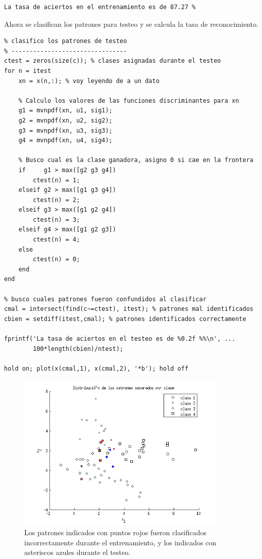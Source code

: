 \documentclass[11pt,a4paper,final]{article}
\begin{document}
\begin{verbatim}La tasa de aciertos en el entrenamiento es de 87.27 %
\end{verbatim}

Ahora se clasifican los patrones para testeo y se calcula la tasa de reconocimiento.

\begin{verbatim}
% clasifico los patrones de testeo
% --------------------------------
ctest = zeros(size(c)); % clases asignadas durante el testeo
for n = itest
    xn = x(n,:); % voy leyendo de a un dato

    % Calculo los valores de las funciones discriminantes para xn
    g1 = mvnpdf(xn, u1, sig1);
    g2 = mvnpdf(xn, u2, sig2);
    g3 = mvnpdf(xn, u3, sig3);
    g4 = mvnpdf(xn, u4, sig4);

    % Busco cual es la clase ganadora, asigno 0 si cae en la frontera
    if     g1 > max([g2 g3 g4])
        ctest(n) = 1;
    elseif g2 > max([g1 g3 g4])
        ctest(n) = 2;
    elseif g3 > max([g1 g2 g4])
        ctest(n) = 3;
    elseif g4 > max([g1 g2 g3])
        ctest(n) = 4;
    else
        ctest(n) = 0;
    end
end

% busco cuales patrones fueron confundidos al clasificar
cmal = intersect(find(c~=ctest), itest); % patrones mal identificados
cbien = setdiff(itest,cmal); % patrones identificados correctamente

fprintf('La tasa de aciertos en el testeo es de %0.2f %%\n', ...
        100*length(cbien)/ntest);

hold on; plot(x(cmal,1), x(cmal,2), '*b'); hold off
\end{verbatim}

\begin{figure}[h]
\includegraphics [width=0.9\textwidth]{Ejercicio2_03.png}
\caption{Los patrones indicados con puntos rojos fueron clasificados incorrectamente durante el entrenamiento, y los indicados con asteriscos azules durante el testeo.}
\label{fig:ejercicio233}
\end{figure}
\end{document}
